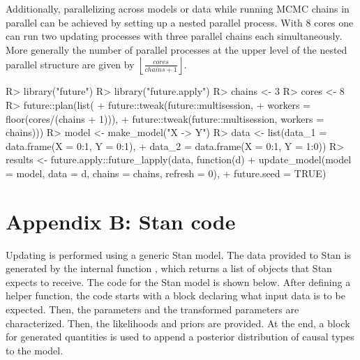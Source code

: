 \documentclass[
  11pt,
  article]{jss}
\renewcommand{\texttt}[1]{\code{#1}}
\begin{document}
Additionally, parallelizing across models or data while running MCMC
chains in parallel can be achieved by setting up a nested parallel
process. With 8 cores one can run two updating processes with three
parallel chains each simultaneously. More generally the number of
parallel processes at the upper level of the nested parallel structure
are given by \(\left \lfloor \frac{cores}{chains + 1} \right \rfloor\).

\begin{CodeInput}
R> library("future")
R> library("future.apply")
R> chains <- 3
R> cores <- 8
R> future::plan(list(
+    future::tweak(future::multisession, 
+    workers = floor(cores/(chains + 1))),
+    future::tweak(future::multisession, workers = chains)))
R> model <- make_model("X -> Y")
R> data <- list(data_1 = data.frame(X = 0:1, Y = 0:1), 
+    data_2 = data.frame(X = 0:1, Y = 1:0))
R> results <- future.apply::future_lapply(data, function(d) {
+    update_model(model = model, data = d, chains = chains, refresh = 0)},
+    future.seed = TRUE)
\end{CodeInput}

\newpage{}

\section*{Appendix B: Stan code}\label{sec-stancode}

Updating is performed using a generic Stan model. The data provided to
Stan is generated by the internal function \texttt{prep\_stan\_data()},
which returns a list of objects that Stan expects to receive. The code
for the Stan model is shown below. After defining a helper function, the
code starts with a block declaring what input data is to be expected.
Then, the parameters and the transformed parameters are characterized.
Then, the likelihoods and priors are provided. At the end, a block for
generated quantities is used to append a posterior distribution of
causal types to the model.
\end{document}
